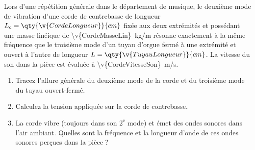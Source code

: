 Lors d'une répétition générale dans le département de musique, le deuxième mode de vibration d'une corde de contrebasse de longueur $L_c = \qty{\v{CordeLongueur}}{cm}$ fixée aux deux extrémités et possédant une masse linéique de \qty{\v{CordeMasseLin}}{kg/m} résonne exactement à la même fréquence que le troisième mode d'un tuyau d'orgue fermé à une extrémité et ouvert à l'autre de longueur $L = \qty{\v{TuyauLongueur}}{cm}$. La vitesse du son dans la pièce est évaluée à \qty{\v{CordeVitesseSon}}{m/s}.

\begin{enumerate}[label=\alph*)]
    \item Tracez l'allure générale du deuxième mode de la corde et du troisième mode du tuyau ouvert-fermé.
    \item Calculez la tension appliquée sur la corde de contrebasse.
    \item La corde vibre (toujours dans son $2^\text{e}$ mode) et émet des ondes sonores dans l'air ambiant. Quelles sont la fréquence et la longueur d'onde de ces ondes sonores perçues dans la pièce ?
\end{enumerate}